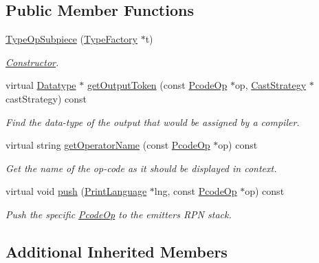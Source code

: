 \subsection*{Public Member Functions}
\begin{DoxyCompactItemize}
\item 
\mbox{\hyperlink{class_type_op_subpiece_aa36156a60c460b7eea78618d1436bc9c}{Type\+Op\+Subpiece}} (\mbox{\hyperlink{class_type_factory}{Type\+Factory}} $\ast$t)
\begin{DoxyCompactList}\small\item\em \mbox{\hyperlink{class_constructor}{Constructor}}. \end{DoxyCompactList}\item 
virtual \mbox{\hyperlink{class_datatype}{Datatype}} $\ast$ \mbox{\hyperlink{class_type_op_subpiece_ac93ca300b551f16888008869eca39150}{get\+Output\+Token}} (const \mbox{\hyperlink{class_pcode_op}{Pcode\+Op}} $\ast$op, \mbox{\hyperlink{class_cast_strategy}{Cast\+Strategy}} $\ast$cast\+Strategy) const
\begin{DoxyCompactList}\small\item\em Find the data-\/type of the output that would be assigned by a compiler. \end{DoxyCompactList}\item 
virtual string \mbox{\hyperlink{class_type_op_subpiece_a8c36b59c2012927cc27fb9fde2ad31ba}{get\+Operator\+Name}} (const \mbox{\hyperlink{class_pcode_op}{Pcode\+Op}} $\ast$op) const
\begin{DoxyCompactList}\small\item\em Get the name of the op-\/code as it should be displayed in context. \end{DoxyCompactList}\item 
virtual void \mbox{\hyperlink{class_type_op_subpiece_a0ef689e39ee81e6c30f6d92a2024c4dd}{push}} (\mbox{\hyperlink{class_print_language}{Print\+Language}} $\ast$lng, const \mbox{\hyperlink{class_pcode_op}{Pcode\+Op}} $\ast$op) const
\begin{DoxyCompactList}\small\item\em Push the specific \mbox{\hyperlink{class_pcode_op}{Pcode\+Op}} to the emitter\textquotesingle{}s R\+PN stack. \end{DoxyCompactList}\end{DoxyCompactItemize}
\subsection*{Additional Inherited Members}


